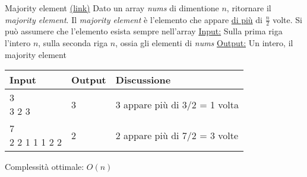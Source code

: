 \begin{esercizio}{Majority element \href{https://leetcode.com/problems/majority-element/submissions/}{(link)}}
	Dato un array \textit{nums} di dimentione $ n $, ritornare il \textit{majority element}. Il \textit{majority element} è l'elemento che appare \underline{di più} di $ \frac{n}{2} $ volte. Si può assumere che l'elemento esista sempre nell'array
	\vskip3mm
	\underline{Input:}
	\vskip3mm Sulla prima riga l'intero $ n $, sulla seconda riga $ n $, ossia gli elementi di \textit{nums}
	\vskip3mm
	\underline{Output:}
	\vskip3mm Un intero, il majority element
	\vskip3mm
	\renewcommand{\cellalign}{l}
	\begin{tabularx}{\textwidth}{llX}
		\toprule
		Input & Output & Discussione \\
		\midrule
		\makecell{3                  \\ 3 2 3} & 3 & 3 appare più di 3/2 = 1 volta \\[12pt]
		\makecell{7                  \\ 2 2 1 1 1 2 2} & 2 & 2 appare più di 7/2 = 3 volte\\
		\bottomrule
	\end{tabularx}
	\vskip3mm
	Complessità ottimale: $ O\left(n\right) $
\end{esercizio}


